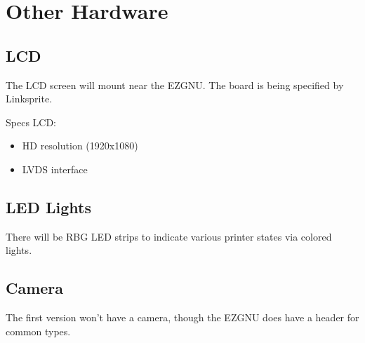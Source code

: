 

\section{Other Hardware}

\subsection{LCD}
The LCD screen will mount near the EZGNU. The board is being specified by
Linksprite.

Specs LCD:

\begin{itemize}
  \item{HD resolution (1920x1080)}
  \item{LVDS interface}
\end{itemize}


\subsection{LED Lights}
There will be RBG LED strips to indicate various printer states via colored
lights.

\subsection{Camera}
The first version won't have a camera, though the EZGNU does have a header for
common types.


